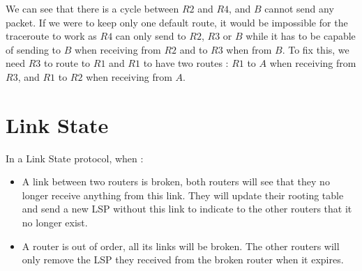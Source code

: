 We can see that there is a cycle between $R2$ and $R4$, and $B$ cannot send any packet. If we were to keep only one default route, it would be impossible for the traceroute to work as $R4$ can only send to $R2$, $R3$ or $B$ while it has to be capable of sending to $B$ when receiving from $R2$ and to $R3$ when from $B$. To fix this, we need $R3$ to route to $R1$ and $R1$ to have two routes : $R1$ to $A$ when receiving from $R3$, and $R1$ to $R2$ when receiving from $A$.

\section{Link State}

In a Link State protocol, when :
\begin{itemize}
\item A link between two routers is broken, both routers will see that they no longer receive anything from this link. They will update their rooting table and send a new LSP without this link to indicate to the other routers that it no longer exist.
\item A router is out of order, all its links will be broken. The other routers will only remove the LSP they received from the broken router when it expires.
\end{itemize}
